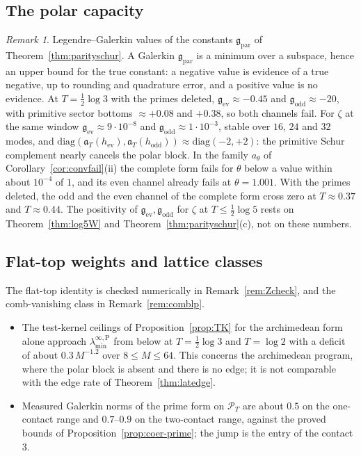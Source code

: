 \documentclass[11pt]{amsart}
\theoremstyle{definition}
\theoremstyle{remark}
\newtheorem{remark}[theorem]{Remark}
\newcommand{\PT}{\mathcal P_T}
\newcommand{\laminfP}{\lambda^{\infty,\mathrm P}_{\min}}
\begin{document}
\subsection{The polar capacity}
\begin{remark}\label{rem:polarcapdiag}
Legendre--Galerkin values of the constants $\mathfrak g_{\mathrm{par}}$ of Theorem~\ref{thm:parityschur}. A Galerkin
$\mathfrak g_{\mathrm{par}}$ is a minimum over a subspace, hence an upper bound for the true constant: a negative value is
evidence of a true negative, up to rounding and quadrature error, and a positive value is no evidence. At
$T=\frac12\log3$ with the primes deleted, $\mathfrak g_{\mathrm{ev}}\approx-0.45$ and $\mathfrak g_{\mathrm{odd}}\approx-20$, with primitive
sector bottoms $\approx+0.08$ and $+0.38$, so both channels fail. For $\zeta$ at the same window
$\mathfrak g_{\mathrm{ev}}\approx9\cdot10^{-8}$ and $\mathfrak g_{\mathrm{odd}}\approx1\cdot10^{-3}$, stable over $16$, $24$ and $32$ modes, and
$\mathrm{diag}(\mathfrak a_T(h_{\mathrm{ev}}),\mathfrak a_T(h_{\mathrm{odd}}))\approx\mathrm{diag}(-2,+2)$: the primitive Schur complement nearly
cancels the polar block. In the family $a_\theta$ of Corollary~\ref{cor:convfail}(ii) the complete form fails for $\theta$
below a value within about $10^{-4}$ of $1$, and its even channel already fails at $\theta=1.001$. With the primes
deleted, the odd and the even channel of the complete form cross zero at $T\approx0.37$ and $T\approx0.44$. The positivity
of $\mathfrak g_{\mathrm{ev}},\mathfrak g_{\mathrm{odd}}$ for $\zeta$ at $T\le\frac12\log5$ rests on Theorem~\ref{thm:log5W} and
Theorem~\ref{thm:parityschur}(c), not on these numbers.
\end{remark}

\subsection{Flat-top weights and lattice classes}
The flat-top identity is checked numerically in Remark~\ref{rem:Zcheck}, and the comb-vanishing class in Remark~\ref{rem:comblp}.

\begin{itemize}
\item The test-kernel ceilings of Proposition~\ref{prop:TK} for the archimedean form alone approach $\laminfP$ from
below at $T=\frac12\log3$ and $T=\log2$ with a deficit of about $0.3\,M^{-1.2}$ over $8\le M\le64$. This concerns the
archimedean program, where the polar block is absent and there is no edge; it is not comparable with the edge rate of
Theorem~\ref{thm:latedge}.
\item Measured Galerkin norms of the prime form on $\PT$ are about $0.5$ on the one-contact range and $0.7$--$0.9$ on
the two-contact range, against the proved bounds of Proposition~\ref{prop:coer-prime}; the jump is the entry of the
contact $3$.
\end{itemize}
\end{document}

